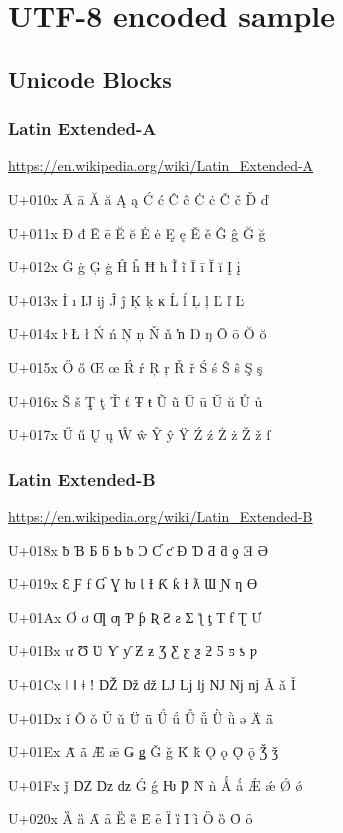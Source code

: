 \chapter{UTF-8 encoded sample}
\section{Unicode Blocks}

\subsection{Latin Extended-A}
\url{https://en.wikipedia.org/wiki/Latin_Extended-A}

U+010x 	Ā 	ā 	Ă 	ă 	Ą 	ą 	Ć 	ć 	Ĉ 	ĉ 	Ċ 	ċ 	Č 	č 	Ď 	ď

U+011x 	Đ 	đ 	Ē 	ē 	Ĕ 	ĕ 	Ė 	ė 	Ę 	ę 	Ě 	ě 	Ĝ 	ĝ 	Ğ 	ğ

U+012x 	Ġ 	ġ 	Ģ 	ģ 	Ĥ 	ĥ 	Ħ 	ħ 	Ĩ 	ĩ 	Ī 	ī 	Ĭ 	ĭ 	Į 	į

U+013x 	İ 	ı 	Ĳ 	ĳ 	Ĵ 	ĵ 	Ķ 	ķ 	ĸ 	Ĺ 	ĺ 	Ļ 	ļ 	Ľ 	ľ 	Ŀ

U+014x 	ŀ 	Ł 	ł 	Ń 	ń 	Ņ 	ņ 	Ň 	ň 	ŉ 	Ŋ 	ŋ 	Ō 	ō 	Ŏ 	ŏ

U+015x 	Ő 	ő 	Œ 	œ 	Ŕ 	ŕ 	Ŗ 	ŗ 	Ř 	ř 	Ś 	ś 	Ŝ 	ŝ 	Ş 	ş

U+016x 	Š 	š 	Ţ 	ţ 	Ť 	ť 	Ŧ 	ŧ 	Ũ 	ũ 	Ū 	ū 	Ŭ 	ŭ 	Ů 	ů

U+017x 	Ű 	ű 	Ų 	ų 	Ŵ 	ŵ 	Ŷ 	ŷ 	Ÿ 	Ź 	ź 	Ż 	ż 	Ž 	ž 	ſ

\subsection{Latin Extended-B}
\url{https://en.wikipedia.org/wiki/Latin_Extended-B}

U+018x 	ƀ 	Ɓ 	Ƃ 	ƃ 	Ƅ 	ƅ 	Ɔ 	Ƈ 	ƈ 	Ɖ 	Ɗ 	Ƌ 	ƌ 	ƍ 	Ǝ 	Ə

U+019x 	Ɛ 	Ƒ 	ƒ 	Ɠ 	Ɣ 	ƕ 	Ɩ 	Ɨ 	Ƙ 	ƙ 	ƚ 	ƛ 	Ɯ 	Ɲ 	ƞ 	Ɵ

U+01Ax 	Ơ 	ơ 	Ƣ 	ƣ 	Ƥ 	ƥ 	Ʀ 	Ƨ 	ƨ 	Ʃ 	ƪ 	ƫ 	Ƭ 	ƭ 	Ʈ 	Ư

U+01Bx 	ư 	Ʊ 	Ʋ 	Ƴ 	ƴ 	Ƶ 	ƶ 	Ʒ 	Ƹ 	ƹ 	ƺ 	ƻ 	Ƽ 	ƽ 	ƾ 	ƿ

U+01Cx 	ǀ 	ǁ 	ǂ 	ǃ 	Ǆ 	ǅ 	ǆ 	Ǉ 	ǈ 	ǉ 	Ǌ 	ǋ 	ǌ 	Ǎ 	ǎ 	Ǐ

U+01Dx 	ǐ 	Ǒ 	ǒ 	Ǔ 	ǔ 	Ǖ 	ǖ 	Ǘ 	ǘ 	Ǚ 	ǚ 	Ǜ 	ǜ 	ǝ 	Ǟ 	ǟ

U+01Ex 	Ǡ 	ǡ 	Ǣ 	ǣ 	Ǥ 	ǥ 	Ǧ 	ǧ 	Ǩ 	ǩ 	Ǫ 	ǫ 	Ǭ 	ǭ 	Ǯ 	ǯ

U+01Fx 	ǰ 	Ǳ 	ǲ 	ǳ 	Ǵ 	ǵ 	Ƕ 	Ƿ 	Ǹ 	ǹ 	Ǻ 	ǻ 	Ǽ 	ǽ 	Ǿ 	ǿ

U+020x 	Ȁ 	ȁ 	Ȃ 	ȃ 	Ȅ 	ȅ 	Ȇ 	ȇ 	Ȉ 	ȉ 	Ȋ 	ȋ 	Ȍ 	ȍ 	Ȏ 	ȏ

